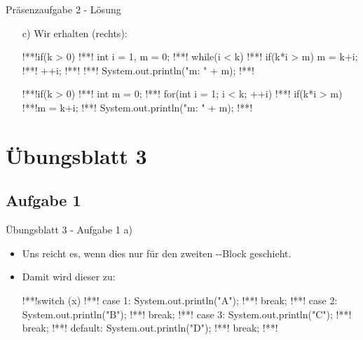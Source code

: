 \begin{frame}[t,fragile]{Präsenzaufgabe 2 - Lösung}
\begin{enumerate}[<+(1)->]
    \item[c)] Wir erhalten (rechts):\\
\begin{minipage}{0.5\linewidth}
    \begin{plainjava}
!**!if(k > 0){
!**!    int i = 1, m = 0;
!**!    while(i < k){
!**!        if(k*i > m) m = k+i;
!**!        ++i;
!**!    }
!**!    System.out.println("m: " + m);
!**!}
\end{plainjava}
    \end{minipage}\hfill\begin{minipage}{0.45\linewidth}
\begin{plainjava}
!**!if(k > 0){
!**!    int m = 0;
!**!    for(int i = 1; i < k; ++i)
!**!        if(k*i > m) !**!m = k+i;
!**!    System.out.println("m: " + m);
!**!}
        \end{plainjava}
    \end{minipage}
\end{enumerate}
\end{frame}


\section{Übungsblatt 3}
\subsection{Aufgabe 1}
\begin{frame}[t,fragile]{Übungsblatt 3 - Aufgabe 1 a)}
    \begin{itemize}[<+(1)->]
        \item Uns reicht es, wenn dies nur für den zweiten --Block geschieht.
        \item Damit wird dieser zu:
\begin{plainjava}
!**!switch (x) {
!**!    case 1:  System.out.println("A");
!**!        break;
!**!    case 2:  System.out.println("B");
!**!        break;
!**!    case 3:  System.out.println("C");
!**!        break;
!**!    default: System.out.println("D");
!**!        break;
!**!}
\end{plainjava}
    \end{itemize}
\end{frame}


